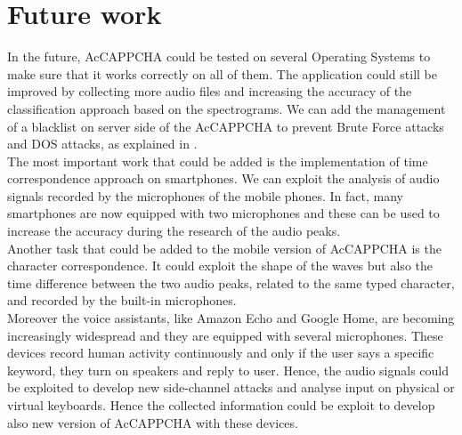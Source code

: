 \chapter{Future work}\label{chapter:Future}
In the future, AcCAPPCHA could be tested on several Operating Systems to make sure that it works correctly on all of them. The application could still be improved by collecting more audio files and increasing the accuracy of the classification approach based on the spectrograms. We can add the management of a blacklist on server side of the AcCAPPCHA to prevent Brute Force attacks and DOS attacks, as explained in .\\
The most important work that could be added is the implementation of time correspondence approach on smartphones. We can exploit the analysis of audio signals recorded by the microphones of the mobile phones. In fact, many smartphones are now equipped with two microphones and these can be used to increase the accuracy during the research of the audio peaks.\\
Another task that could be added to the mobile version of AcCAPPCHA is the character correspondence. It could exploit the shape of the waves but also the time difference between the two audio peaks, related to the same typed character, and  recorded by the built-in microphones\cite{smartphone_acoustic}. \\
Moreover the voice assistants, like Amazon Echo and Google Home, are becoming increasingly widespread and they are equipped with several microphones. These devices record human activity continuously and only if the user says a specific keyword, they turn on speakers and reply to user. Hence, the audio signals could be exploited to develop new side-channel attacks and analyse input on physical or virtual keyboards\cite{voice_assistant}. Hence the collected information could be exploit to develop also new version of AcCAPPCHA with these devices.\\